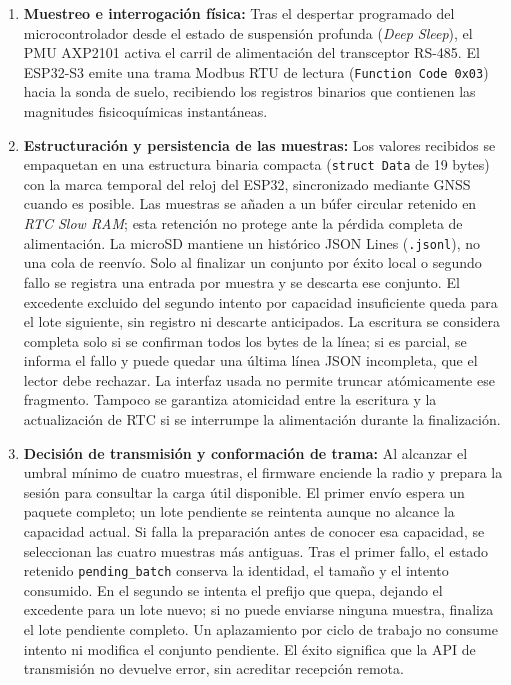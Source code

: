 \begin{enumerate}
    \item \textbf{Muestreo e interrogación física:} Tras el despertar programado del microcontrolador desde el estado de suspensión profunda (\textit{Deep Sleep}), el PMU AXP2101 activa el carril de alimentación del transceptor RS-485. El ESP32-S3 emite una trama Modbus RTU de lectura (\texttt{Function Code 0x03}) hacia la sonda de suelo, recibiendo los registros binarios que contienen las magnitudes fisicoquímicas instantáneas.
    
    \item \textbf{Estructuración y persistencia de las muestras:} Los valores recibidos se empaquetan en una estructura binaria compacta (\texttt{struct Data} de 19 bytes) con la marca temporal del reloj del ESP32, sincronizado mediante GNSS cuando es posible. Las muestras se añaden a un búfer circular retenido en \textit{RTC Slow RAM}; esta retención no protege ante la pérdida completa de alimentación. La microSD mantiene un histórico JSON Lines (\texttt{.jsonl}), no una cola de reenvío. Solo al finalizar un conjunto por éxito local o segundo fallo se registra una entrada por muestra y se descarta ese conjunto. El excedente excluido del segundo intento por capacidad insuficiente queda para el lote siguiente, sin registro ni descarte anticipados. La escritura se considera completa solo si se confirman todos los bytes de la línea; si es parcial, se informa el fallo y puede quedar una última línea JSON incompleta, que el lector debe rechazar. La interfaz usada no permite truncar atómicamente ese fragmento. Tampoco se garantiza atomicidad entre la escritura y la actualización de RTC si se interrumpe la alimentación durante la finalización.

    \item \textbf{Decisión de transmisión y conformación de trama:} Al alcanzar el umbral mínimo de cuatro muestras, el firmware enciende la radio y prepara la sesión para consultar la carga útil disponible. El primer envío espera un paquete completo; un lote pendiente se reintenta aunque no alcance la capacidad actual. Si falla la preparación antes de conocer esa capacidad, se seleccionan las cuatro muestras más antiguas. Tras el primer fallo, el estado retenido \texttt{pending\_batch} conserva la identidad, el tamaño y el intento consumido. En el segundo se intenta el prefijo que quepa, dejando el excedente para un lote nuevo; si no puede enviarse ninguna muestra, finaliza el lote pendiente completo. Un aplazamiento por ciclo de trabajo no consume intento ni modifica el conjunto pendiente. El éxito significa que la API de transmisión no devuelve error, sin acreditar recepción remota.


\end{enumerate}
